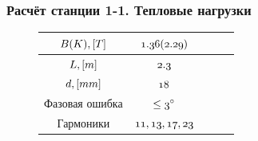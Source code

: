 \documentclass[14pt, hyperref = {colorlinks}]{beamer}
\begin{document}
\small
\begin{frame}
\frametitle{Расчёт станции 1-1. Тепловые нагрузки}\label{t1}
\vspace{-10pt}
\begin{figure}[h]
	\hspace{-30pt}		
		\begin{minipage}[h]{0.49\linewidth}

		\begin{minipage}[h]{0.99\linewidth}
			\tiny
			\vspace{10pt}
			\begin{table}[h]
				\begin{tabular}{|c|c|c|c|c|}
					\hline\hline
					\rule{0pt}{3ex}$\mathnormal{B(K), [T]}$   & $\mathnormal{1.36(2.29)}$   \\ \hline
					\rule{0pt}{3ex}$\mathnormal{L, [m]}$ 	  & $\mathnormal{2.3}$          \\ \hline
					\rule{0pt}{3ex}$\mathnormal{d, [mm]}$     & $\mathnormal{18}$    		\\ \hline
					\rule{0pt}{3ex}Фазовая ошибка             &$ \mathnormal{\leq 3^{\circ}}$  \\ \hline
					\rule{0pt}{3ex}Гармоники	              & $\mathnormal{11, 13, 17, 23}$  \\
					\hline
				\end{tabular}
			\end{table}
		\end{minipage}
	\end{minipage}
	\begin{minipage}[h]{0.49\linewidth}

\end{minipage}
\end{figure}
\end{frame}
\end{document}
